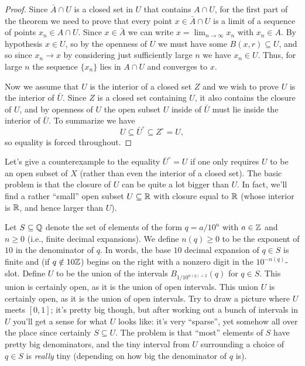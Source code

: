 \begin{proof}
  Since \(\bar A\cap U\) is a closed set in \(U\) that contains
  \(A\cap U\), for the first part of the theorem we need to prove that
  every point \(x\in\bar A\cap U\) is a limit of a sequence of points
  \(x_n\in A\cap U\). Since \(x\in\bar A\) we can write
  \(x=\lim_{n\to\infty}x_n\) with \(x_n\in A\). By hypothesis \(x\in U\),
  so by the openness of \(U\) we must have some \(B(x,r)\subseteq U\), and
  so since \(x_n\to x\) by considering just sufficiently large \(n\) we
  have \(x_n\in U\). Thus, for large \(n\) the sequence \(\{x_n\}\) lies in
  \(A\cap U\) and converges to \(x\).

  Now we assume that \(U\) is the interior of a closed set \(Z\) and we
  wish to prove \(U\) is the interior of \(\bar U\). Since \(Z\) is a
  closed set containing \(U\), it also contains the closure of \(U\), and
  by openness of \(U\) the open subset \(U\) inside of \(\bar U\) must lie
  inside the interior of \(\bar U\). To summarize we have
  \[
    U\subseteq{\bar U}^\circ\subseteq Z^\circ=U,
  \]
  so equality is forced throughout.
\end{proof}

Let's give a counterexample to the equality \({\bar U}^\circ=U\) if one
only requires \(U\) to be an open subset of \(X\) (rather than even the
interior of a closed set). The basic problem is that the closure of \(U\)
can be quite a lot bigger than \(U\). In fact, we'll find a rather
``small'' open subset \(U\subseteq\mathbb{R}\) with closure equal to \(\mathbb{R}\)
(whose interior is \(\mathbb{R}\), and hence larger than \(U\)).

Let \(S\subseteq\mathbb{Q}\) denote the set of elements of the form \(q=a/10^n\)
with \(a\in\mathbb{Z}\) and \(n\geq 0\) (i.e., finite decimal expansions). We
define \(n(q)\geq 0\) to be the exponent of \(10\) in the denominator of
\(q\). In words, the base \(10\) decimal expansion of \(q\in S\) is finite
and (if \(q\notin 10\mathbb{Z}\)) begins on the right with a nonzero digit in the
\(10^{-n(q)}\)-slot. Define \(U\) to be the union of the intervals
\(B_{1/10^{n(q)+2}}(q)\) for \(q\in S\). This union is certainly open, as
it is the union of open intervals. This union \(U\) is certainly open, as
it is the union of open intervals. Try to draw a picture where \(U\) meets
\([0,1]\); it's pretty big though, but after working out a bunch of
intervals in \(U\) you'll get a sense for what \(U\) looks like: it's very
``sparse'', yet somehow all over the place since certainly \(S\subseteq
U\). The problem is that ``most'' elements of \(S\) have pretty big
denominators, and the tiny interval from \(U\) surrounding a choice of
\(q\in S\) is \emph{really} tiny (depending on how big the denominator of
\(q\) is).

